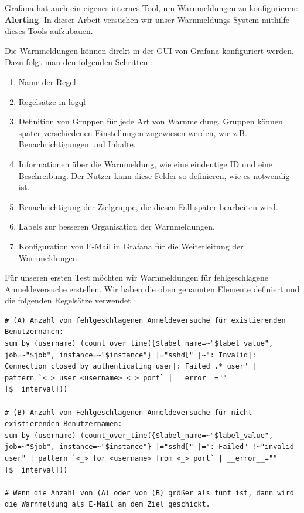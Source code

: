 
Grafana hat auch ein eigenes internes Tool, um Warnmeldungen zu konfigurieren: \textbf{Alerting}. In dieser Arbeit versuchen wir unser Warnmeldungs-System mithilfe dieses Tools aufzubauen.

Die Warnmeldungen können direkt in der \gls{GUI} von Grafana konfiguriert werden. Dazu folgt man den folgenden Schritten \citep{Grafana_alerting}:

{
\begin{enumerate}[noitemsep]
   \item Name der Regel
   \item Regelsätze in \gls{logql}
   \item Definition von Gruppen für jede Art von Warnmeldung. Gruppen können später verschiedenen Einstellungen zugewiesen werden, wie z.B. Benachrichtigungen und Inhalte.
   \item Informationen über die Warnmeldung, wie eine eindeutige ID und eine Beschreibung. Der Nutzer kann diese Felder so definieren, wie es notwendig ist.
   \item Benachrichtigung der Zielgruppe, die diesen Fall später bearbeiten wird.
   \item Labels zur besseren Organisation der Warnmeldungen.
   \item Konfiguration von E-Mail in Grafana für die Weiterleitung der Warnmeldungen.
\end{enumerate}
}

Für unseren ersten Test möchten wir Warnmeldungen für fehlgeschlagene Anmeldeversuche erstellen. Wir haben die oben genannten Elemente definiert und die folgenden Regelsätze verwendet \citep{VoidQuark_sshlogs}:

{
\begin{Verbatim}[frame=single]
# (A) Anzahl von fehlgeschlagenen Anmeldeversuche für existierenden
Benutzernamen:
sum by (username) (count_over_time({$label_name=~"$label_value", 
job=~"$job", instance=~"$instance"} |="sshd[" |~": Invalid|: 
Connection closed by authenticating user|: Failed .* user" | 
pattern `<_> user <username> <_> port` | __error__="" 
[$__interval]))

# (B) Anzahl von Fehlgeschlagenen Anmeldeversuche für nicht 
existierenden Benutzernamen:
sum by (username) (count_over_time({$label_name=~"$label_value", 
job=~"$job", instance=~"$instance"} |="sshd[" |=": Failed" !~"invalid 
user" | pattern `<_> for <username> from <_> port` | __error__=""
[$__interval]))

# Wenn die Anzahl von (A) oder von (B) größer als fünf ist, dann wird
die Warnmeldung als E-Mail an dem Ziel geschickt.
\end{Verbatim}
}


